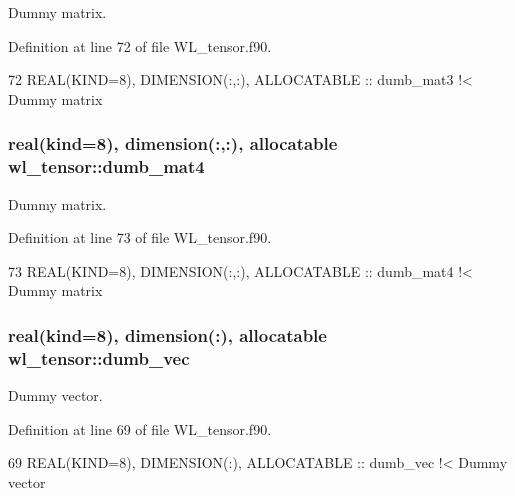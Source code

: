 Dummy matrix. 



Definition at line 72 of file W\+L\+\_\+tensor.\+f90.


\begin{DoxyCode}
72   \textcolor{keywordtype}{REAL(KIND=8)}, \textcolor{keywordtype}{DIMENSION(:,:)}, \textcolor{keywordtype}{ALLOCATABLE} :: dumb\_mat3\textcolor{comment}{ !< Dummy matrix}
\end{DoxyCode}
\subsubsection[{\texorpdfstring{dumb\+\_\+mat4}{dumb_mat4}}]{\setlength{\rightskip}{0pt plus 5cm}real(kind=8), dimension(\+:,\+:), allocatable wl\+\_\+tensor\+::dumb\+\_\+mat4\hspace{0.3cm}{\ttfamily [private]}}\hypertarget{namespacewl__tensor_a1f1d3c5466015a2fa24afa056c19a4e3}{}\label{namespacewl__tensor_a1f1d3c5466015a2fa24afa056c19a4e3}


Dummy matrix. 



Definition at line 73 of file W\+L\+\_\+tensor.\+f90.


\begin{DoxyCode}
73   \textcolor{keywordtype}{REAL(KIND=8)}, \textcolor{keywordtype}{DIMENSION(:,:)}, \textcolor{keywordtype}{ALLOCATABLE} :: dumb\_mat4\textcolor{comment}{ !< Dummy matrix}
\end{DoxyCode}
\subsubsection[{\texorpdfstring{dumb\+\_\+vec}{dumb_vec}}]{\setlength{\rightskip}{0pt plus 5cm}real(kind=8), dimension(\+:), allocatable wl\+\_\+tensor\+::dumb\+\_\+vec\hspace{0.3cm}{\ttfamily [private]}}\hypertarget{namespacewl__tensor_abe9c42af0dab6da6584889043aaab679}{}\label{namespacewl__tensor_abe9c42af0dab6da6584889043aaab679}


Dummy vector. 



Definition at line 69 of file W\+L\+\_\+tensor.\+f90.


\begin{DoxyCode}
69   \textcolor{keywordtype}{REAL(KIND=8)}, \textcolor{keywordtype}{DIMENSION(:)}, \textcolor{keywordtype}{ALLOCATABLE} :: dumb\_vec\textcolor{comment}{ !< Dummy vector}
\end{DoxyCode}

